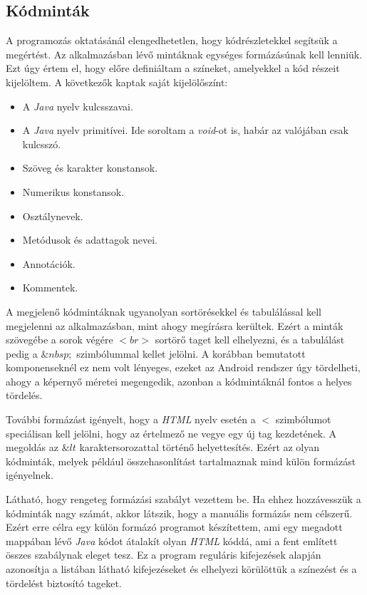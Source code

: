 \documentclass[12pt,a4paper]{article}
\begin{document}
	\subsection{Kódminták} \label{kodmintak}
	
	A programozás oktatásánál elengedhetetlen, hogy kódrészletekkel segítsük a megértést. Az alkalmazásban lévő mintáknak egységes formázásúnak kell lenniük. Ezt úgy értem el, hogy előre definiáltam a színeket, amelyekkel a kód részeit kijelöltem. A következők kaptak saját kijelölőszínt:
	
	\begin{itemize}
		\item A \textit{Java} nyelv kulcsszavai.
		\item A \textit{Java} nyelv primitívei. Ide soroltam a \textit{void}-ot is, habár az valójában csak kulcsszó.
		\item Szöveg és karakter konstansok.
		\item Numerikus konstansok.
		\item Osztálynevek.
		\item Metódusok és adattagok nevei.
		\item Annotációk.
		\item Kommentek. 
	\end{itemize}
	
	A megjelenő kódmintáknak ugyanolyan sortörésekkel és tabulálással kell megjelenni az alkalmazásban, mint ahogy megírásra kerültek. Ezért a minták szövegébe a sorok végére $<br>$ sortörő taget kell elhelyezni, és a tabulálást pedig a $\&nbsp;$ szimbólummal kellet jelölni. A korábban bemutatott komponenseknél ez nem volt lényeges, ezeket az Android rendszer úgy tördelheti, ahogy a képernyő méretei megengedik, azonban a kódmintáknál fontos a helyes tördelés.
	
	További formázást igényelt, hogy a \textit{HTML} nyelv esetén a $<$ szimbólumot speciálisan kell jelölni, hogy az értelmező ne vegye egy új tag kezdetének. A megoldás az $\&lt$ karaktersorozattal történő helyettesítés. Ezért az olyan kódminták, melyek például összehasonlítást tartalmaznak mind külön formázást igényelnek.
	
	Látható, hogy rengeteg formázási szabályt vezettem be. Ha ehhez hozzávesszük a kódminták nagy számát, akkor látszik, hogy a manuális formázás nem célszerű. Ezért erre  célra egy külön formázó programot készítettem, ami egy megadott mappában lévő \textit{Java} kódot átalakít olyan \textit{HTML} kóddá, ami a fent említett összes szabálynak eleget tesz. Ez a program reguláris kifejezések alapján azonosítja a listában látható kifejezéseket és elhelyezi körülöttük a színezést és a tördelést biztosító tageket.  
	
\end{document}
